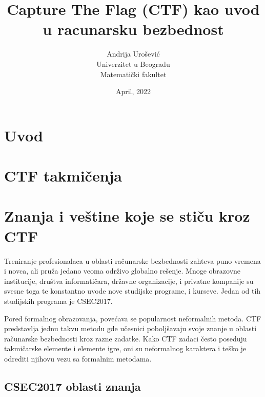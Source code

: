 \documentclass[12pt, a4paper, twocolumn]{article}
\title{Capture The Flag (CTF) kao uvod u racunarsku bezbednost}
\author{Andrija Urošević\\Univerzitet u Beogradu\\Matematički fakultet}
\date{April, 2022}
\begin{document}
\maketitle

\begin{abstract}
\end{abstract}

\section{Uvod}

\section{CTF takmičenja}

\section{Znanja i veštine koje se stiču kroz CTF}

Treniranje profesionalaca u oblasti računarske bezbednosti zahteva puno 
vremena i novca, ali pruža jedano veoma održivo globalno rešenje. Mnoge 
obrazovne institucije, društva informatičara, državne organizacije, i privatne
kompanije su svesne toga te konstantno uvode nove studijske programe, 
i kurseve. Jedan od tih studijskih programa je CSEC2017.

Pored formalnog obrazovanja, povećava se popularnost neformalnih metoda.
CTF predstavlja jednu takvu metodu gde učesnici poboljšavaju svoje znanje u
oblasti računarske bezbednosti kroz razne zadatke. Kako CTF zadaci često 
poseduju takmičarske elemente i elemente igre, oni su neformalnog karaktera
i teško je odrediti njihovu vezu sa formalnim metodama.

\subsection{CSEC2017 oblasti znanja}
\end{document}
